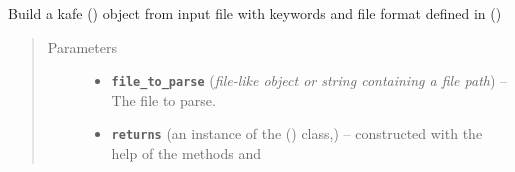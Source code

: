 \documentclass[a4paper,10pt,english]{sphinxmanual}
\begin{document}
\begin{fulllineitems}
\label{index:kafe.file_tools.buildFit_fromFile}
Build a kafe {\hyperref[index:kafe.fit.Fit]{\emph{}}} () object from input file with
keywords and file format defined in
{\hyperref[index:kafe.file_tools.parse_general_inputfile]{\emph{}}} ()
\begin{quote}\begin{description}
\item[{Parameters}] \leavevmode\begin{itemize}
\item {} 
\textbf{\texttt{file\_to\_parse}} (\emph{file-like object or string containing a file path}) -- The file to parse.

\item {} 
\textbf{\texttt{returns}} (an instance of the {\hyperref[index:kafe.fit.Fit]{\emph{}}} () class,) -- constructed with the help of the methods
 and

\end{itemize}

\end{description}\end{quote}

\end{fulllineitems}

\end{document}
